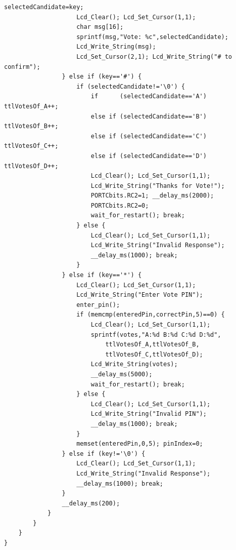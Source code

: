\documentclass[11pt, a4paper]{report}
\begin{document}
\begin{lstlisting}[caption={Main source code for the digital voting system},
                   label={lst:main}]
                    selectedCandidate=key;
                    Lcd_Clear(); Lcd_Set_Cursor(1,1);
                    char msg[16];
                    sprintf(msg,"Vote: %c",selectedCandidate);
                    Lcd_Write_String(msg);
                    Lcd_Set_Cursor(2,1); Lcd_Write_String("# to confirm");
                } else if (key=='#') {
                    if (selectedCandidate!='\0') {
                        if      (selectedCandidate=='A') ttlVotesOf_A++;
                        else if (selectedCandidate=='B') ttlVotesOf_B++;
                        else if (selectedCandidate=='C') ttlVotesOf_C++;
                        else if (selectedCandidate=='D') ttlVotesOf_D++;
                        Lcd_Clear(); Lcd_Set_Cursor(1,1);
                        Lcd_Write_String("Thanks for Vote!");
                        PORTCbits.RC2=1; __delay_ms(2000);
                        PORTCbits.RC2=0;
                        wait_for_restart(); break;
                    } else {
                        Lcd_Clear(); Lcd_Set_Cursor(1,1);
                        Lcd_Write_String("Invalid Response");
                        __delay_ms(1000); break;
                    }
                } else if (key=='*') {
                    Lcd_Clear(); Lcd_Set_Cursor(1,1);
                    Lcd_Write_String("Enter Vote PIN");
                    enter_pin();
                    if (memcmp(enteredPin,correctPin,5)==0) {
                        Lcd_Clear(); Lcd_Set_Cursor(1,1);
                        sprintf(votes,"A:%d B:%d C:%d D:%d",
                            ttlVotesOf_A,ttlVotesOf_B,
                            ttlVotesOf_C,ttlVotesOf_D);
                        Lcd_Write_String(votes);
                        __delay_ms(5000);
                        wait_for_restart(); break;
                    } else {
                        Lcd_Clear(); Lcd_Set_Cursor(1,1);
                        Lcd_Write_String("Invalid PIN");
                        __delay_ms(1000); break;
                    }
                    memset(enteredPin,0,5); pinIndex=0;
                } else if (key!='\0') {
                    Lcd_Clear(); Lcd_Set_Cursor(1,1);
                    Lcd_Write_String("Invalid Response");
                    __delay_ms(1000); break;
                }
                __delay_ms(200);
            }
        }
    }
}
\end{lstlisting}
\end{document}
